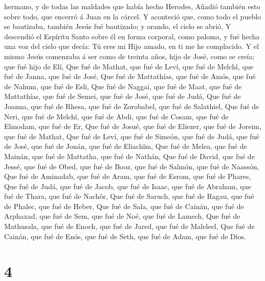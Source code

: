 hermano, y de todas las maldades que había hecho Herodes,
 Añadió también esto sobre todo, que encerró á Juan en la
cárcel.  Y aconteció que, como todo el pueblo se
bautizaba, también Jesús fué bautizado; y orando, el cielo se abrió,
 Y descendió el Espíritu Santo sobre él en forma
corporal, como paloma, y fué hecha una voz del cielo que decía: Tú eres
mi Hijo amado, en ti me he complacido.  Y el mismo Jesús
comenzaba á ser como de treinta años, hijo de José, como se creía; que
fué hijo de Elí,  Que fué de Mathat, que fué de Leví, que
fué de Melchî, que fué de Janna, que fué de José,  Que
fué de Mattathías, que fué de Amós, que fué de Nahum, que fué de Esli,
 Que fué de Naggai, que fué de Maat, que fué de
Mattathías, que fué de Semei, que fué de José, que fué de Judá,
 Que fué de Joanna, que fué de Rhesa, que fué de
Zorobabel, que fué de Salathiel,  Que fué de Neri, que
fué de Melchî, que fué de Abdi, que fué de Cosam, que fué de Elmodam,
que fué de Er,  Que fué de Josué, que fué de Eliezer, que
fué de Joreim, que fué de Mathat,  Que fué de Leví, que
fué de Simeón, que fué de Judá, que fué de José, que fué de Jonán, que
fué de Eliachîm,  Que fué de Melea, que fué de Mainán,
que fué de Mattatha, que fué de Nathán,  Que fué de
David, que fué de Jessé, que fué de Obed, que fué de Booz, que fué de
Salmón, que fué de Naassón,  Que fué de Aminadab, que fué
de Aram, que fué de Esrom, que fué de Phares,  Que fué de
Judá, que fué de Jacob, que fué de Isaac, que fué de Abraham, que fué de
Thara, que fué de Nachôr,  Que fué de Saruch, que fué de
Ragau, que fué de Phalec, que fué de Heber,  Que fué de
Sala, que fué de Cainán, que fué de Arphaxad, que fué de Sem, que fué de
Noé, que fué de Lamech,  Que fué de Mathusala, que fué de
Enoch, que fué de Jared, que fué de Maleleel,  Que fué de
Cainán, que fué de Enós, que fué de Seth, que fué de Adam, que fué de
Dios.

\hypertarget{section-3}{%
\section{4}\label{section-3}}

